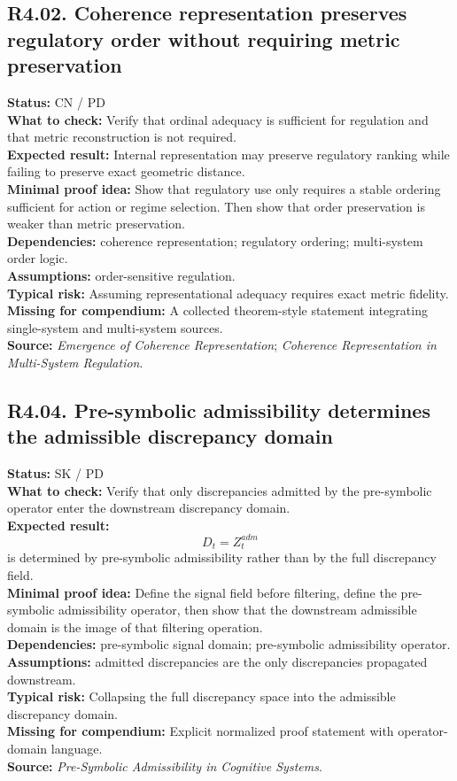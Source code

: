 \documentclass[12pt]{article}
\begin{document}
	\subsection*{R4.02. Coherence representation preserves regulatory order without requiring metric preservation}
	\textbf{Status:} CN / PD \\
	\textbf{What to check:} Verify that ordinal adequacy is sufficient for regulation and that metric reconstruction is not required. \\
	\textbf{Expected result:} Internal representation may preserve regulatory ranking while failing to preserve exact geometric distance. \\
	\textbf{Minimal proof idea:} Show that regulatory use only requires a stable ordering sufficient for action or regime selection. Then show that order preservation is weaker than metric preservation. \\
	\textbf{Dependencies:} coherence representation; regulatory ordering; multi-system order logic. \\
	\textbf{Assumptions:} order-sensitive regulation. \\
	\textbf{Typical risk:} Assuming representational adequacy requires exact metric fidelity. \\
	\textbf{Missing for compendium:} A collected theorem-style statement integrating single-system and multi-system sources. \\
	\textbf{Source:} \emph{Emergence of Coherence Representation}; \emph{Coherence Representation in Multi-System Regulation}.
	
	\subsection*{R4.04. Pre-symbolic admissibility determines the admissible discrepancy domain}
	\textbf{Status:} SK / PD \\
	\textbf{What to check:} Verify that only discrepancies admitted by the pre-symbolic operator enter the downstream discrepancy domain. \\
	\textbf{Expected result:} 
	\[
	D_t=Z_t^{adm}
	\]
	is determined by pre-symbolic admissibility rather than by the full discrepancy field. \\
	\textbf{Minimal proof idea:} Define the signal field before filtering, define the pre-symbolic admissibility operator, then show that the downstream admissible domain is the image of that filtering operation. \\
	\textbf{Dependencies:} pre-symbolic signal domain; pre-symbolic admissibility operator. \\
	\textbf{Assumptions:} admitted discrepancies are the only discrepancies propagated downstream. \\
	\textbf{Typical risk:} Collapsing the full discrepancy space into the admissible discrepancy domain. \\
	\textbf{Missing for compendium:} Explicit normalized proof statement with operator-domain language. \\
	\textbf{Source:} \emph{Pre-Symbolic Admissibility in Cognitive Systems}.
	
\end{document}
